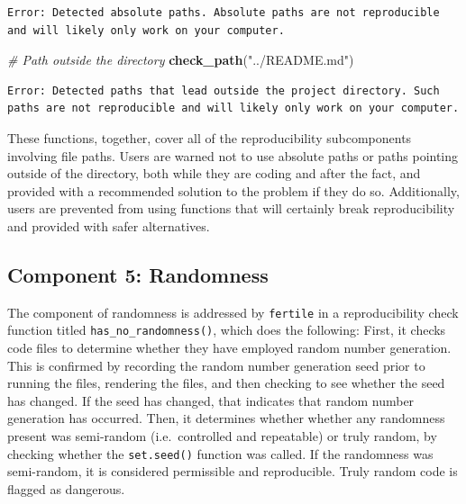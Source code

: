 \documentclass[12pt,twoside]{reedthesis}
\newenvironment{Shaded}{\begin{snugshade}}{\end{snugshade}}
\newcommand{\KeywordTok}[1]{\textcolor[rgb]{0.13,0.29,0.53}{\textbf{#1}}}
\newcommand{\StringTok}[1]{\textcolor[rgb]{0.31,0.60,0.02}{#1}}
\newcommand{\CommentTok}[1]{\textcolor[rgb]{0.56,0.35,0.01}{\textit{#1}}}
\newcommand{\NormalTok}[1]{#1}
\begin{document}
\begin{verbatim}
Error: Detected absolute paths. Absolute paths are not reproducible and will likely only work on your computer.
\end{verbatim}
\begin{Shaded}
\begin{Highlighting}[]
\CommentTok{# Path outside the directory}
\KeywordTok{check_path}\NormalTok{(}\StringTok{"../README.md"}\NormalTok{)}
\end{Highlighting}
\end{Shaded}
\begin{verbatim}
Error: Detected paths that lead outside the project directory. Such paths are not reproducible and will likely only work on your computer.
\end{verbatim}
These functions, together, cover all of the reproducibility
subcomponents involving file paths. Users are warned not to use absolute
paths or paths pointing outside of the directory, both while they are
coding and after the fact, and provided with a recommended solution to
the problem if they do so. Additionally, users are prevented from using
functions that will certainly break reproducibility and provided with
safer alternatives.

\subsection{Component 5: Randomness}\label{component-5-randomness}

The component of randomness is addressed by \texttt{fertile} in a
reproducibility check function titled \texttt{has\_no\_randomness()},
which does the following: First, it checks code files to determine
whether they have employed random number generation. This is confirmed
by recording the random number generation seed prior to running the
files, rendering the files, and then checking to see whether the seed
has changed. If the seed has changed, that indicates that random number
generation has occurred. Then, it determines whether whether any
randomness present was semi-random (i.e.~controlled and repeatable) or
truly random, by checking whether the \texttt{set.seed()} function was
called. If the randomness was semi-random, it is considered permissible
and reproducible. Truly random code is flagged as dangerous.
\end{document}
